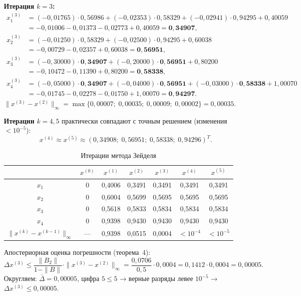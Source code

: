 \documentclass[a4paper, final]{article}
\begin{document}
\medskip\textbf{Итерация $k=3$:}
\begin{align*}
x_1^{(3)} &= (-0{,}01765)\cdot0{,}56986 + (-0{,}02353)\cdot0{,}58329 + (-0{,}02941)\cdot0{,}94295 + 0{,}40059\\
           &= -0{,}01006 - 0{,}01373 - 0{,}02773 + 0{,}40059 = \mathbf{0{,}34907},\\
x_2^{(3)} &= (-0{,}01250)\cdot0{,}58329 + (-0{,}02500)\cdot0{,}94295 + 0{,}60038\\
           &= -0{,}00729 - 0{,}02357 + 0{,}60038 = \mathbf{0{,}56951},\\
x_3^{(3)} &= (-0{,}30000)\cdot\mathbf{0{,}34907} + (-0{,}20000)\cdot\mathbf{0{,}56951} + 0{,}80200\\
           &= -0{,}10472 - 0{,}11390 + 0{,}80200 = \mathbf{0{,}58338},\\
x_4^{(3)} &= (-0{,}05000)\cdot\mathbf{0{,}34907} + (-0{,}04000)\cdot\mathbf{0{,}56951}
             + (-0{,}03000)\cdot\mathbf{0{,}58338} + 1{,}00070\\
           &= -0{,}01745 - 0{,}02278 - 0{,}01750 + 1{,}00070 = \mathbf{0{,}94297}.
\end{align*}
$\|x^{(3)}-x^{(2)}\|_\infty = \max\{0{,}00007;\;0{,}00035;\;0{,}00009;\;0{,}00002\} = 0{,}00035.$

\medskip\textbf{Итерации $k=4,5$} практически совпадают с точным решением
(изменения $< 10^{-5}$):
\[
x^{(4)} \approx x^{(5)} \approx (0{,}34908;\;0{,}56951;\;0{,}58338;\;0{,}94296)^T.
\]

\begin{table}[h!]
\centering
\caption{Итерации метода Зейделя}
\label{tab:seidel}
\renewcommand{\arraystretch}{1.3}
\begin{tabular}{|c|c|c|c|c|c|c|}
\hline
 & $x^{(0)}$ & $x^{(1)}$ & $x^{(2)}$ & $x^{(3)}$ & $x^{(4)}$ & $x^{(5)}$ \\
\hline
$x_1$ & 0 & 0,4006 & 0,3491 & 0,3491 & 0,3491 & 0,3491 \\
$x_2$ & 0 & 0,6004 & 0,5699 & 0,5695 & 0,5695 & 0,5695 \\
$x_3$ & 0 & 0,5618 & 0,5833 & 0,5834 & 0,5834 & 0,5834 \\
$x_4$ & 0 & 0,9398 & 0,9430 & 0,9430 & 0,9430 & 0,9430 \\
\hline
$\|x^{(k)}-x^{(k-1)}\|_\infty$ & --- & 0,9398 & 0,0515 & 0,0004 & $<10^{-4}$ & $<10^{-5}$ \\
\hline
\end{tabular}
\end{table}

Апостериорная оценка погрешности (теорема~4):
\[
\Delta x^{(3)} \leq \frac{\|B_2\|}{1-\|B\|}\cdot\|x^{(3)}-x^{(2)}\|_\infty
= \frac{0{,}0706}{0{,}5}\cdot 0{,}0004 = 0{,}1412\cdot 0{,}0004 = 0{,}00005.
\]
Округляем: $\bar\Delta = 0{,}00005$, цифра $5 \leq 5$
→ верные разряды левее $10^{-5}$ → $\Delta x^{(3)} \leq 0{,}00005$.
\newpage
\end{document}
